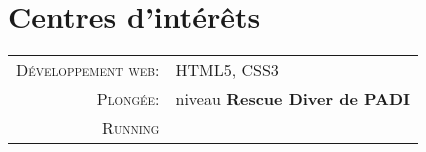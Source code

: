 %
%
%

\section{\texorpdfstring{\color{Blue}Centres d'intérêts}{Centres d'intérêts}}
\begin{tabular}{rl}
    \textsc{Développement web:} & HTML5, CSS3 \\ 
    \textsc{Plongée:} & niveau \textbf{Rescue Diver de PADI} \\
    \textsc{Running} & \\
\end{tabular}